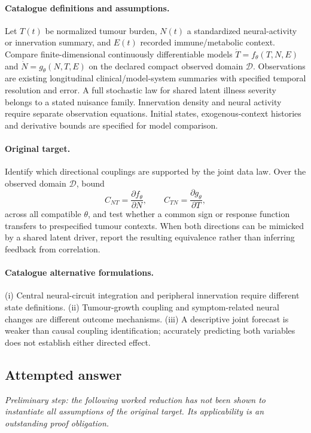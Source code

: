 \documentclass[11pt]{article}
\begin{document}
\paragraph{Catalogue definitions and assumptions.}
Let $T(t)$ be normalized tumour burden, $N(t)$ a standardized neural-activity or innervation summary, and $E(t)$ recorded immune/metabolic context. Compare finite-dimensional continuously differentiable models $\dot T=f_\theta(T,N,E)$ and $\dot N=g_\theta(N,T,E)$ on the declared compact observed domain $\mathcal D$. Observations are existing longitudinal clinical/model-system summaries with specified temporal resolution and error. A full stochastic law for shared latent illness severity belongs to a stated nuisance family. Innervation density and neural activity require separate observation equations. Initial states, exogenous-context histories and derivative bounds are specified for model comparison.
\paragraph{Original target.}
Identify which directional couplings are supported by the joint data law. Over the observed domain $\mathcal D$, bound
    \[C_{NT}=\frac{\partial f_\theta}{\partial N},\qquad
    C_{TN}=\frac{\partial g_\theta}{\partial T},\]
    across all compatible $\theta$, and test whether a common sign or response function transfers to prespecified tumour contexts. When both directions can be mimicked by a shared latent driver, report the resulting equivalence rather than inferring feedback from correlation.
\paragraph{Catalogue alternative formulations.}
(i) Central neural-circuit integration and peripheral innervation require different state definitions. (ii) Tumour-growth coupling and symptom-related neural changes are different outcome mechanisms. (iii) A descriptive joint forecast is weaker than causal coupling identification; accurately predicting both variables does not establish either directed effect.
\subsection{Attempted answer}
\noindent\emph{Preliminary step: the following worked reduction has not been shown to instantiate all assumptions of the original target. Its applicability is an outstanding proof obligation.}
\end{document}
